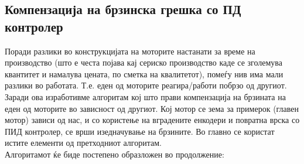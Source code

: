 \documentclass{article}
\begin{document}
\subsection{Компензација на брзинска грешка со ПД контролер}

Поради разлики во конструкцијата на моторите настанати за време на производство (што е честа појава кај сериско производство каде се зголемува квантитет и намалува цената, по сметка на квалитетот), помеѓу нив има мали разлики во работата. Т.е. еден од моторите реагира/работи побрзо од другиот. Заради ова изработивме алгоритам кој што прави компензација на брзината на еден од моторите во зависност од другиот. Кој мотор се зема за примерок (главен мотор) зависи од нас, и со користење на вградените енкодери и повратна врска со ПИД контролер, се врши изедначување на брзините. Во главно се користат истите елементи од претходниот алгоритам.\\ Алгоритамот ќе биде постепено образложен во продолжение:
\end{document}
